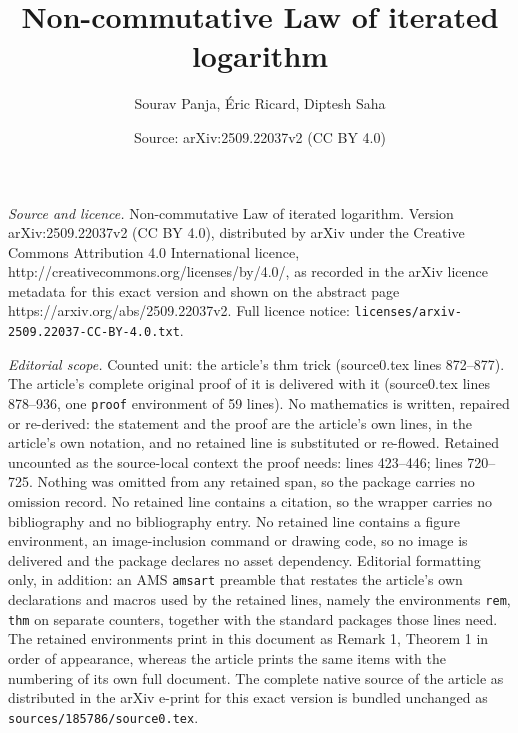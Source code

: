 \documentclass[10pt,a4paper]{amsart}
\title{Non-commutative Law of iterated logarithm}
\author{Sourav Panja, \'Eric Ricard, Diptesh Saha}
\date{Source: arXiv:2509.22037v2 (CC BY 4.0)}
\begin{document}
\maketitle

\noindent\emph{Source and licence.} Non-commutative Law of iterated logarithm. Version arXiv:2509.22037v2 (CC BY 4.0), distributed by arXiv under the Creative Commons Attribution 4.0 International licence, http://creativecommons.org/licenses/by/4.0/, as recorded in the arXiv licence metadata for this exact version and shown on the abstract page https://arxiv.org/abs/2509.22037v2. Full licence notice: \texttt{licenses/arxiv-2509.22037-CC-BY-4.0.txt}.\par\smallskip

\noindent\textit{Editorial scope.} Counted unit: the article's thm trick (source0.tex lines 872--877). The article's complete original proof of it is delivered with it (source0.tex lines 878--936, one \texttt{proof} environment of 59 lines). No mathematics is written, repaired or re-derived: the statement and the proof are the article's own lines, in the article's own notation, and no retained line is substituted or re-flowed.  Retained uncounted as the source-local context the proof needs: lines 423--446; lines 720--725.  Nothing was omitted from any retained span, so the package carries no omission record.  No retained line contains a citation, so the wrapper carries no bibliography and no bibliography entry.  No retained line contains a figure environment, an image-inclusion command or drawing code, so no image is delivered and the package declares no asset dependency.  Editorial formatting only, in addition: an AMS \texttt{amsart} preamble that restates the article's own declarations and macros used by the retained lines, namely the environments \texttt{rem}, \texttt{thm} on separate counters, together with the standard packages those lines need.  The retained environments print in this document as Remark 1, Theorem 1 in order of appearance, whereas the article prints the same items with the numbering of its own full document.  The complete native source of the article as distributed in the arXiv e-print for this exact version is bundled unchanged as \texttt{sources/185786/source0.tex}.
\end{document}
